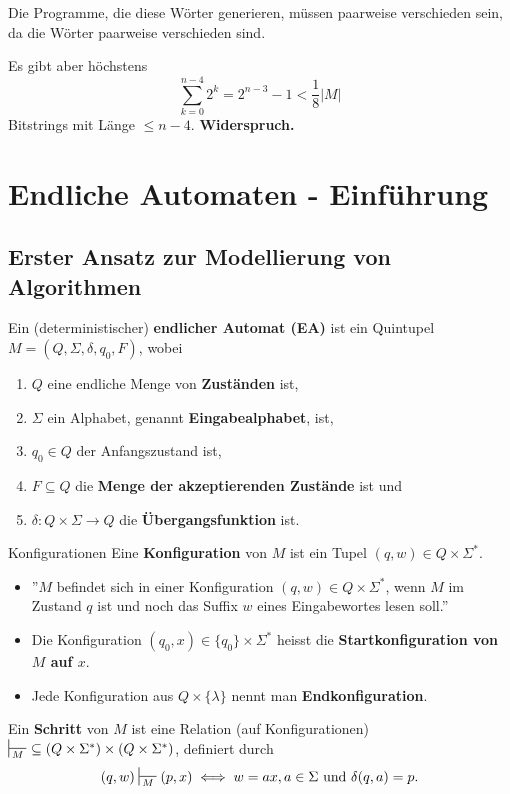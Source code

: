 \documentclass[a4paper, 11pt]{article}
\begin{document}
        Die Programme, die diese Wörter generieren, müssen paarweise verschieden sein, da die Wörter paarweise verschieden sind.
    
        Es gibt aber höchstens 
        $$\sum_{k=0}^{n-4}2^k = 2^{n-3} - 1 < \frac{1}{8}|M|$$
        Bitstrings mit Länge $\leq n-4$. \textbf{Widerspruch.}
    


        \vspace*{1cm}
    


    \section{Endliche Automaten - Einführung}

	\subsection{Erster Ansatz zur Modellierung von Algorithmen}
	\begin{mainbox}{}
		Ein (deterministischer) \textbf{endlicher Automat (EA)} ist ein Quintupel $M = (Q, \Sigma, \delta, q_0, F)$, wobei
		\begin{enumerate}[label=(\roman*)]
			\item $Q$ eine endliche Menge von \textbf{Zuständen} ist,
			\item $\Sigma$ ein Alphabet, genannt \textbf{Eingabealphabet}, ist,
			\item $q_0 \in Q$ der Anfangszustand ist,
			\item $F \subseteq Q$ die \textbf{Menge der akzeptierenden Zustände} ist und
			\item $\delta: Q \times \Sigma \to Q$ die \textbf{Übergangsfunktion} ist.
		\end{enumerate}
	\end{mainbox}



	
	\begin{mainbox}{Konfigurationen}
		Eine \textbf{Konfiguration} von $M$ ist ein Tupel $(q, w) \in Q \times \Sigma^*$. 
	\end{mainbox}
	\begin{itemize}[label=-]
		\item ''$M$ befindet sich in einer Konfiguration $(q,w) \in Q \times \Sigma^*$, wenn $M$ im Zustand $q$ ist und noch das Suffix $w$ eines Eingabewortes lesen soll.''
		\item Die Konfiguration $(q_0, x) \in \{q_0\} \times \Sigma^*$ heisst die \textbf{Startkonfiguration von $M$ auf $x$}.
		\item Jede Konfiguration aus $Q \times \{\lambda\}$ nennt man \textbf{Endkonfiguration}.
	\end{itemize}
	\begin{mainbox}{}
		Ein \textbf{Schritt} von $M$ ist eine Relation (auf Konfigurationen) $\sststile{M}{} \ \subseteq (Q \times \Sigma^*)\times(Q\times \Sigma^*)$, definiert durch
		$$(q, w) \sststile{M}{}(p, x) \iff w = ax, a \in \Sigma \text{ und }\delta(q, a) = p.$$
	\end{mainbox}
\end{document}
